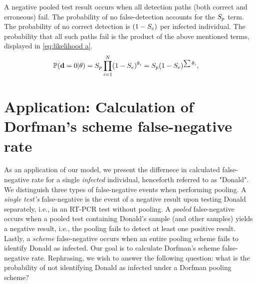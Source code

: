 \documentclass{article}
\begin{document}
A negative pooled test result occurs when all detection paths (both
correct and erroneous) fail. The probability of no false-detection
accounts for the $S_p$ term. The probability of no correct detection
is $(1-S_e)$ per infected individual. The probability that all such
paths fail is the product of the above mentioned terms, displayed in
\eqref{eq:likelihood a}.%
\begin{align}%
    \Pr(\data=0 | \theta) &= \spec\prod_{i=1}^N
    (1-\sens)^{\theta_i} = \spec(1-\Se)^{\sum\theta_i}, \label{eq:likelihood a}
\end{align}




\section{Application: Calculation of Dorfman's scheme false-negative rate}\label{subsec:detailed}
As an application of our model, we present the differnece in
calculated false-negative rate for a single \emph{infected}
individual, henceforth referred to as "Donald".  We distinguish three
types of false-negative events when performing pooling. A \emph{single
  test's} false-negative is the event of a negative result upon
testing Donald separately, i.e., in an RT-PCR test without pooling. A
\emph{pooled} false-negative occurs when a pooled test containing
Donald's sample (and other samples) yields a negative result, i.e.,
the pooling fails to detect at least one positive result. Lastly, a
\emph{scheme} false-negative occurs when an entire pooling scheme
fails to identify Donald as infected. Our goal is to calculate
Dorfman's scheme false-negative rate. Rephrasing, we wish to answer
the following question: what is the probability of not identifying
Donald as infected under a Dorfman pooling scheme?
\end{document}
